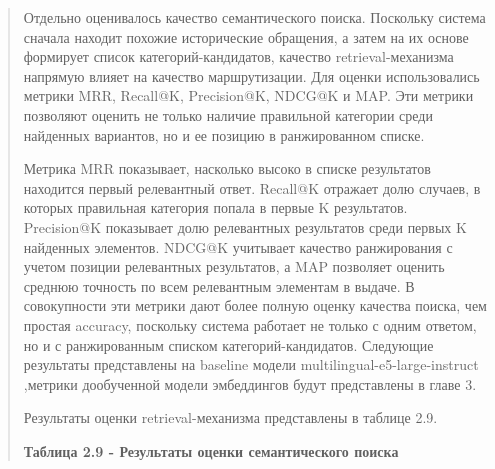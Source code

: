 \documentclass[
]{article}
\begin{document}
\begin{quote}
Отдельно оценивалось качество семантического поиска. Поскольку система
сначала находит похожие исторические обращения, а затем на их основе
формирует список категорий-кандидатов, качество retrieval-механизма
напрямую влияет на качество маршрутизации. Для оценки использовались
метрики MRR, Recall@K, Precision@K, NDCG@K и MAP. Эти метрики позволяют
оценить не только наличие правильной категории среди найденных
вариантов, но и ее позицию в ранжированном списке.

Метрика MRR показывает, насколько высоко в списке результатов находится
первый релевантный ответ. Recall@K отражает долю случаев, в которых
правильная категория попала в первые K результатов. Precision@K
показывает долю релевантных результатов среди первых K найденных
элементов. NDCG@K учитывает качество ранжирования с учетом позиции
релевантных результатов, а MAP позволяет оценить среднюю точность по
всем релевантным элементам в выдаче. В совокупности эти метрики дают
более полную оценку качества поиска, чем простая accuracy, поскольку
система работает не только с одним ответом, но и с ранжированным списком
категорий-кандидатов. Следующие результаты представлены на baseline
модели multilingual-e5-large-instruct ,метрики дообученной модели
эмбеддингов будут представлены в главе 3.

Результаты оценки retrieval-механизма представлены в таблице 2.9.

\textbf{Таблица 2.9 - Результаты оценки семантического поиска}
\end{quote}
\end{document}
